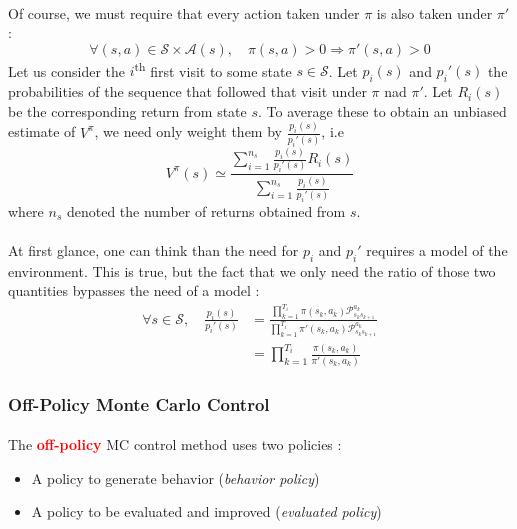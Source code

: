 \documentclass[a4paper]{article}
\begin{document}
{{{{{						\paragraph{} Of course, we must require that every action taken under $\pi$ is also taken under $\pi'$ : 
						\begin{equation}
							\forall{(s,a)}\in\mathcal{S}\times\mathcal{A}(s), \quad \pi(s,a) >0 \Rightarrow \pi'(s,a)>0
						\end{equation}
						Let us consider the $i$\textsuperscript{th} first visit to some state $s\in\mathcal{S}$. Let $p_i(s)$ and $p_i'(s)$ the probabilities of the sequence that followed that visit under $\pi$ nad $\pi'$. Let $R_i(s)$ be the corresponding return from state $s$. To average these to obtain an unbiased estimate of $V^\pi$, we need only weight them by $\frac{p_i(s)}{p_i'(s)}$, i.e 
						\begin{equation}
							V^\pi(s) \simeq \frac{\displaystyle \sum_{i=1}^{n_s}\frac{p_i(s)}{p_i'(s)}R_i(s) }{\displaystyle\sum_{i=1}^{n_s}\frac{p_i(s)}{p_i'(s)}}
						\end{equation}
						where $n_s$ denoted the number of returns obtained from $s$. 
						
						\paragraph{} At first glance, one can think than the need for $p_i$ and $p_i'$ requires a model of the environment. This is true, but the fact that we only need the ratio of those two quantities bypasses the need of a model : 
						\begin{equation}
							\begin{aligned}
								\forall s\in\mathcal{S}, \quad 
									\frac{p_i(s)}{p_i'(s)} &=\frac{ \prod_{k=1}^{T_{i}} \pi(s_k,a_k)\mathcal{P}_{s_{k}s_{k+1}}^{a_{k}}}{\prod_{k=1}^{T_{i}} \pi'(s_k,a_k)\mathcal{P}_{s_{k}s_{k+1}}^{a_{k}}}\\
									&= \prod_{k=1}^{T_i} \frac{\pi(s_k,a_k)}{\pi'(s_k,a_k)}
							\end{aligned}
						\end{equation}
					}
					
					\subsubsection{Off-Policy Monte Carlo Control}
					{
						\paragraph{} The \textbf{\textcolor{red}{off-policy}} MC control method uses two policies : 
						\begin{itemize}
							\item A policy to generate behavior (\emph{behavior policy})
							\item A policy to be evaluated and improved (\emph{evaluated policy})
						\end{itemize}
						
}}}}}
\end{document}
